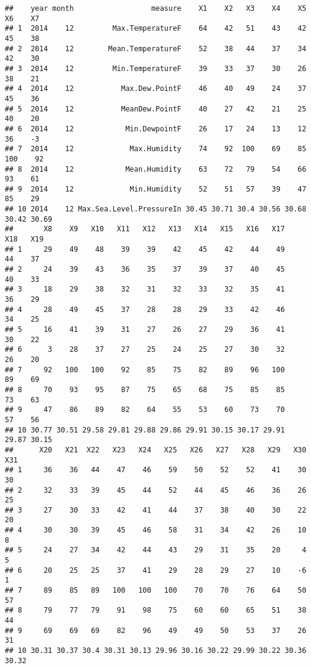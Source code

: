 \documentclass[
]{article}
\begin{document}
\begin{verbatim}
##    year month                  measure    X1    X2   X3    X4    X5    X6    X7
## 1  2014    12         Max.TemperatureF    64    42   51    43    42    45    38
## 2  2014    12        Mean.TemperatureF    52    38   44    37    34    42    30
## 3  2014    12         Min.TemperatureF    39    33   37    30    26    38    21
## 4  2014    12           Max.Dew.PointF    46    40   49    24    37    45    36
## 5  2014    12           MeanDew.PointF    40    27   42    21    25    40    20
## 6  2014    12            Min.DewpointF    26    17   24    13    12    36    -3
## 7  2014    12             Max.Humidity    74    92  100    69    85   100    92
## 8  2014    12            Mean.Humidity    63    72   79    54    66    93    61
## 9  2014    12             Min.Humidity    52    51   57    39    47    85    29
## 10 2014    12 Max.Sea.Level.PressureIn 30.45 30.71 30.4 30.56 30.68 30.42 30.69
##       X8    X9   X10   X11   X12   X13   X14   X15   X16   X17   X18   X19
## 1     29    49    48    39    39    42    45    42    44    49    44    37
## 2     24    39    43    36    35    37    39    37    40    45    40    33
## 3     18    29    38    32    31    32    33    32    35    41    36    29
## 4     28    49    45    37    28    28    29    33    42    46    34    25
## 5     16    41    39    31    27    26    27    29    36    41    30    22
## 6      3    28    37    27    25    24    25    27    30    32    26    20
## 7     92   100   100    92    85    75    82    89    96   100    89    69
## 8     70    93    95    87    75    65    68    75    85    85    73    63
## 9     47    86    89    82    64    55    53    60    73    70    57    56
## 10 30.77 30.51 29.58 29.81 29.88 29.86 29.91 30.15 30.17 29.91 29.87 30.15
##      X20   X21  X22   X23   X24   X25   X26   X27   X28   X29   X30   X31
## 1     36    36   44    47    46    59    50    52    52    41    30    30
## 2     32    33   39    45    44    52    44    45    46    36    26    25
## 3     27    30   33    42    41    44    37    38    40    30    22    20
## 4     30    30   39    45    46    58    31    34    42    26    10     8
## 5     24    27   34    42    44    43    29    31    35    20     4     5
## 6     20    25   25    37    41    29    28    29    27    10    -6     1
## 7     89    85   89   100   100   100    70    70    76    64    50    57
## 8     79    77   79    91    98    75    60    60    65    51    38    44
## 9     69    69   69    82    96    49    49    50    53    37    26    31
## 10 30.31 30.37 30.4 30.31 30.13 29.96 30.16 30.22 29.99 30.22 30.36 30.32
\end{verbatim}
\end{document}
